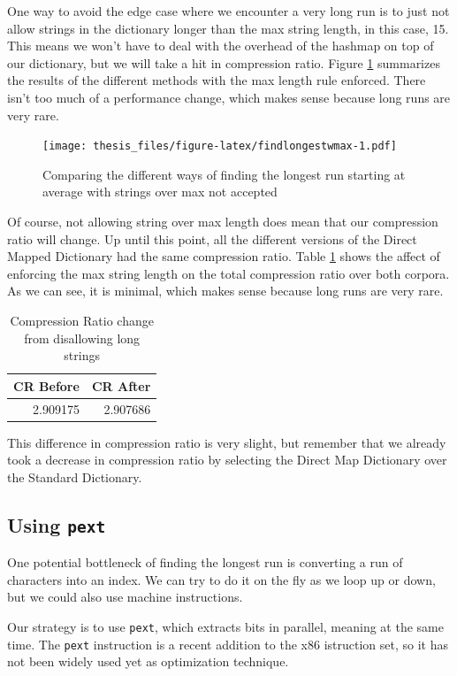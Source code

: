 \documentclass[12pt,twoside]{reedthesis}
\begin{document}
One way to avoid the edge case where we encounter a very long run is to just not allow strings in the dictionary longer than the max string length, in this case, 15. This means we won't have to deal with the overhead of the hashmap on top of our dictionary, but we will take a hit in compression ratio. Figure \ref{fig:findlongestwmax} summarizes the results of the different methods with the max length rule enforced. There isn't too much of a performance change, which makes sense because long runs are very rare.
\begin{figure}
\centering
\texttt{[image: thesis\_files/figure-latex/findlongestwmax-1.pdf]}
\caption{\label{fig:findlongestwmax}Comparing the different ways of finding the longest run starting at average with strings over max not accepted}
\end{figure}
Of course, not allowing string over max length does mean that our compression ratio will change. Up until this point, all the different versions of the Direct Mapped Dictionary had the same compression ratio. Table \ref{tab:maxenforcedstats} shows the affect of enforcing the max string length on the total compression ratio over both corpora. As we can see, it is minimal, which makes sense because long runs are very rare.
\begin{table}

\caption{\label{tab:maxenforcedstats}Compression Ratio change from disallowing long strings}
\centering
\begin{tabular}[t]{rr}
\toprule
CR Before & CR After\\
\midrule
2.909175 & 2.907686\\
\bottomrule
\end{tabular}
\end{table}
This difference in compression ratio is very slight, but remember that we already took a decrease in compression ratio by selecting the Direct Map Dictionary over the Standard Dictionary.

\hypertarget{using-pext}{%
\subsection{\texorpdfstring{Using \texttt{pext}}{Using pext}}\label{using-pext}}

One potential bottleneck of finding the longest run is converting a run of characters into an index. We can try to do it on the fly as we loop up or down, but we could also use machine instructions.

Our strategy is to use \texttt{pext}, which extracts bits in parallel, meaning at the same time. The \texttt{pext} instruction is a recent addition to the x86 istruction set, so it has not been widely used yet as optimization technique.
\end{document}
